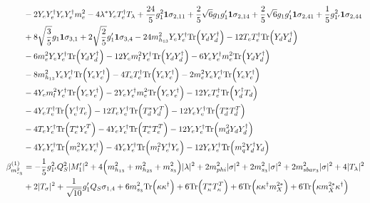 {\begin{align}
 &-2 {Y_e  Y_{e}^{\dagger}  Y_e  Y_{e}^{\dagger}  m_e^2} -4 \lambda^* {Y_e  T_{e}^{\dagger}} T_{\lambda} +\frac{24}{5} g_{1}^{2} {\bf 1} \sigma_{2,11} +\frac{2}{5} \sqrt{6} g_1 g_1' {\bf 1} \sigma_{2,14} +\frac{2}{5} \sqrt{6} g_1 g_1' {\bf 1} \sigma_{2,41} +\frac{1}{5} g_{1'}^{2} {\bf 1} \sigma_{2,44} \nonumber \\ 
 &+8 \sqrt{\frac{3}{5}} g_1 {\bf 1} \sigma_{3,1} +2 \sqrt{\frac{2}{5}} g_1' {\bf 1} \sigma_{3,4} -24 m_{h_{13}}^2 {Y_e  Y_{e}^{\dagger}} \mbox{Tr}\Big({Y_d  Y_{d}^{\dagger}}\Big) -12 {T_e  T_{e}^{\dagger}} \mbox{Tr}\Big({Y_d  Y_{d}^{\dagger}}\Big) \nonumber \\ 
 &-6 {m_e^2  Y_e  Y_{e}^{\dagger}} \mbox{Tr}\Big({Y_d  Y_{d}^{\dagger}}\Big) -12 {Y_e  m_l^2  Y_{e}^{\dagger}} \mbox{Tr}\Big({Y_d  Y_{d}^{\dagger}}\Big) -6 {Y_e  Y_{e}^{\dagger}  m_e^2} \mbox{Tr}\Big({Y_d  Y_{d}^{\dagger}}\Big) \nonumber \\ 
 &-8 m_{h_{13}}^2 {Y_e  Y_{e}^{\dagger}} \mbox{Tr}\Big({Y_e  Y_{e}^{\dagger}}\Big) -4 {T_e  T_{e}^{\dagger}} \mbox{Tr}\Big({Y_e  Y_{e}^{\dagger}}\Big) -2 {m_e^2  Y_e  Y_{e}^{\dagger}} \mbox{Tr}\Big({Y_e  Y_{e}^{\dagger}}\Big) \nonumber \\ 
 &-4 {Y_e  m_l^2  Y_{e}^{\dagger}} \mbox{Tr}\Big({Y_e  Y_{e}^{\dagger}}\Big) -2 {Y_e  Y_{e}^{\dagger}  m_e^2} \mbox{Tr}\Big({Y_e  Y_{e}^{\dagger}}\Big) -12 {Y_e  T_{e}^{\dagger}} \mbox{Tr}\Big({Y_{d}^{\dagger}  T_d}\Big) \nonumber \\ 
 &-4 {Y_e  T_{e}^{\dagger}} \mbox{Tr}\Big({Y_{e}^{\dagger}  T_e}\Big) -12 {T_e  Y_{e}^{\dagger}} \mbox{Tr}\Big({T_d^*  Y_{d}^{T}}\Big) -12 {Y_e  Y_{e}^{\dagger}} \mbox{Tr}\Big({T_d^*  T_{d}^{T}}\Big) \nonumber \\ 
 &-4 {T_e  Y_{e}^{\dagger}} \mbox{Tr}\Big({T_e^*  Y_{e}^{T}}\Big) -4 {Y_e  Y_{e}^{\dagger}} \mbox{Tr}\Big({T_e^*  T_{e}^{T}}\Big) -12 {Y_e  Y_{e}^{\dagger}} \mbox{Tr}\Big({m_d^2  Y_d  Y_{d}^{\dagger}}\Big) \nonumber \\ 
 &-4 {Y_e  Y_{e}^{\dagger}} \mbox{Tr}\Big({m_e^2  Y_e  Y_{e}^{\dagger}}\Big) -4 {Y_e  Y_{e}^{\dagger}} \mbox{Tr}\Big({m_l^2  Y_{e}^{\dagger}  Y_e}\Big) -12 {Y_e  Y_{e}^{\dagger}} \mbox{Tr}\Big({m_q^2  Y_{d}^{\dagger}  Y_d}\Big) \\ 
\beta_{m_{s_3}^2}^{(1)} & =  
-\frac{1}{5} g_{1'}^{2} Q_{S}^{2} |M_1'|^2 +4 \Big(m_{h_{13}}^2 + m_{h_{23}}^2 + m_{s_3}^2\Big)|\lambda|^2 +2 m_{phi}^2 |\sigma|^2 +2 m_{s_3}^2 |\sigma|^2 +2 m_{sbar_3}^2 |\sigma|^2 +4 |T_{\lambda}|^2 \nonumber \\ 
 &+2 |T_{\sigma}|^2 +\frac{1}{\sqrt{10}} g_1' Q_{S} \sigma_{1,4} +6 m_{s_3}^2 \mbox{Tr}\Big({\kappa  \kappa^{\dagger}}\Big) +6 \mbox{Tr}\Big({T_{\kappa}^*  T_{\kappa}^{T}}\Big) +6 \mbox{Tr}\Big({\kappa  \kappa^{\dagger}  m_{X}^{2 *}}\Big) +6 \mbox{Tr}\Big({\kappa  m_{\bar{X}}^{2 *}  \kappa^{\dagger}}\Big) \\ 

\end{align}}
